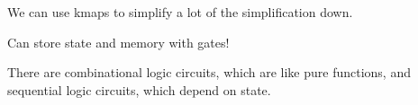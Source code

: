
We can use kmaps to simplify a lot of the simplification down.

Can store state and memory with gates!

There are combinational logic circuits, which are like pure functions, and sequential logic circuits, which depend on state.
